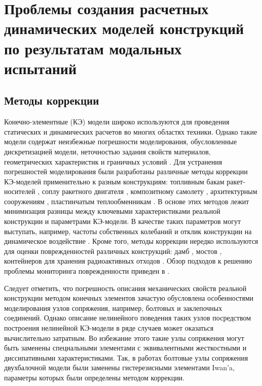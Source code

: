 \chapter{Проблемы создания расчетных динамических моделей конструкций по результатам модальных испытаний}

\section{Методы коррекции} 

Конечно-элементные (КЭ) модели широко используются для проведения статических и динамических расчетов во многих областях техники. Однако такие модели содержат неизбежные погрешности моделирования, обусловленные дискретизацией модели, неточностью задания свойств материалов, геометрических характеристик и граничных условий \cite{lib:modelUpdating:Bartilson}. Для устранения погрешностей моделирования были разработаны различные методы коррекции КЭ-моделей применительно к разным конструкциям: топливным бакам ракет-носителей \cite{lib:modelUpdating:Li&Tian}, соплу ракетного двигателя \cite{lib:modelUpdating:Yan&Li}, композитному самолету \cite{lib:modelUpdating:Zhao&Gupta}, архитектурным сооружениям \cite{lib:modelUpdating:Girardi&Padovani}, пластинчатым теплообменникам \cite{lib:modelUpdating:Guo&Wang}. В основе этих методов лежит минимизация разницы между ключевыми характеристиками реальной конструкции и параметрами КЭ-модели. В качестве таких параметров могут выступать, например, частоты собственных колебаний и отклик конструкции на динамическое воздействие \cite{lib:modelUpdating:Petersen&Oiseth}. Кроме того, методы коррекции нередко используются для оценки поврежденностей различных конструкций: дамб \cite{lib:modelUpdating:Bayraktar&Sevim}, мостов \cite{lib:modelUpdating:Cong&Thoi, lib:modelUpdating:Polanco}, контейнеров для хранения радиоактивных отходов \cite{lib:modelUpdating:Eiras}. Обзор подходов к решению проблемы мониторинга поврежденности приведен в \cite{lib:modelUpdating:Simoen}. 

Следует отметить, что погрешность описания механических свойств реальной конструкции методом конечных элементов зачастую обусловлена особенностями моделирования узлов сопряжения, например, болтовых и заклепочных соединений. Однако описание нелинейного поведения таких узлов посредством построения нелинейной КЭ-модели в ряде случаев может оказаться вычислительно затратным. Во избежание этого такие узлы сопряжения могут быть заменены специальными элементами с эквивалентными жесткостными и диссипативными характеристиками. Так, в работах \cite{lib:modelUpdating:Lacayo, lib:modelUpdating:Yuan} болтовые узлы сопряжения двухбалочной модели были заменены гистерезисными элементами Iwan’a, параметры которых были определены методом коррекции. 

